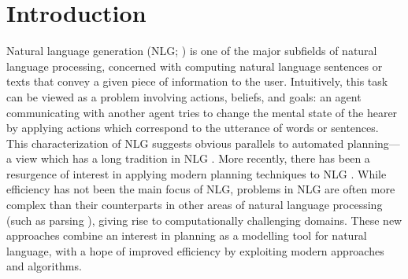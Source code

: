 
\section{Introduction}
\label{sec:introduction}

Natural language generation (NLG; \citeauthor{reiter00building}
\citeyear{reiter00building}) is one of the major subfields of natural
language processing, concerned with computing natural language sentences or
texts that convey a given piece of information to the user. Intuitively,
this task can be viewed as a problem involving actions, beliefs, and goals:
an agent communicating with another agent tries to change the mental state
of the hearer by applying actions which correspond to the utterance of
words or sentences. This characterization of NLG suggests obvious parallels
to automated planning---a view which has a long tradition in NLG
\cite{appelt:planning,young94dpocl}.  More recently, there has been a
resurgence of interest in applying modern planning techniques to NLG
\cite{Steedman-Petrick:07,KolSto07,benotti08b}.  While efficiency has not
been the main focus of NLG, problems in NLG are often more complex than
their counterparts in other areas of natural language processing (such as
parsing \cite{KolStr02}), giving rise to computationally challenging
domains. These new approaches combine an interest in planning as a
modelling tool for natural language, with a hope of improved efficiency by
exploiting modern approaches and algorithms.





